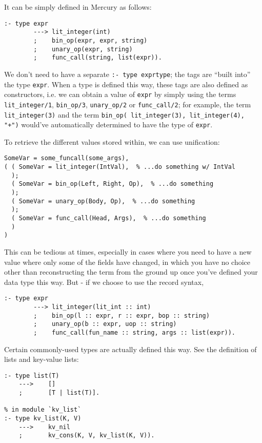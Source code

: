   It can be simply defined in Mercury as follows:

\begin{lstlisting}[language=Mercury]
:- type expr
        ---> lit_integer(int)
        ;    bin_op(expr, expr, string)
        ;    unary_op(expr, string)
        ;    func_call(string, list(expr)).
\end{lstlisting}

  We don't need to have a separate \texttt{:- type exprtype}; the tags are ``built into'' the type \texttt{expr}. When a type is defined this way, these tags are also defined as constructors, i.e. we can obtain a value of \texttt{expr} by simply using the terms \texttt{lit\_integer/1}, \texttt{bin\_op/3}, \texttt{unary\_op/2} or \texttt{func\_call/2}; for example, the term \texttt{lit\_integer(3)} and the term \texttt{bin\_op( lit\_integer(3), lit\_integer(4), "+")} would've automatically determined to have the type of \texttt{expr}.

  To retrieve the different values stored within, we can use unification:

\begin{lstlisting}[language=Mercury]
% ...
SomeVar = some_funcall(some_args),
( ( SomeVar = lit_integer(IntVal),  % ...do something w/ IntVal
  );
  ( SomeVar = bin_op(Left, Right, Op),  % ...do something
  );
  ( SomeVar = unary_op(Body, Op),  % ...do something
  );
  ( SomeVar = func_call(Head, Args),  % ...do something
  )
)
\end{lstlisting}

  This can be tedious at times, especially in cases where you need to have a new value where only some of the fields have changed, in which you have no choice other than reconstructing the term from the ground up once you've defined your data type this way. But - if we choose to use the record syntax, 

\begin{lstlisting}[language=Mercury]
:- type expr
        ---> lit_integer(lit_int :: int)
        ;    bin_op(l :: expr, r :: expr, bop :: string)
        ;    unary_op(b :: expr, uop :: string)
        ;    func_call(fun_name :: string, args :: list(expr)).
\end{lstlisting}

  Certain commonly-used types are actually defined this way. See the definition of lists and key-value lists:

\begin{lstlisting}[language=Mercury]
% in module `list`
:- type list(T)
    --->    []
    ;       [T | list(T)].

% in module `kv_list`
:- type kv_list(K, V)
    --->    kv_nil
    ;       kv_cons(K, V, kv_list(K, V)).
\end{lstlisting}


